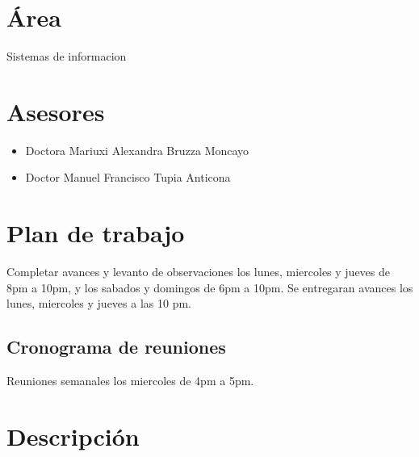 \documentclass{article}
\begin{document}


\section{Área}
Sistemas de informacion

\section{Asesores}
\begin{itemize}
    \item{Doctora Mariuxi Alexandra Bruzza Moncayo}
    \item{Doctor Manuel Francisco Tupia Anticona}
\end{itemize}

\section{Plan de trabajo}

Completar avances y levanto de observaciones los lunes, miercoles y jueves de
8pm a 10pm, y los sabados y domingos de 6pm a 10pm.
Se entregaran avances los lunes, miercoles y jueves a las 10 pm.

\subsection{Cronograma de reuniones}

Reuniones semanales los miercoles de 4pm a 5pm.

\section{Descripción}
\end{document}
